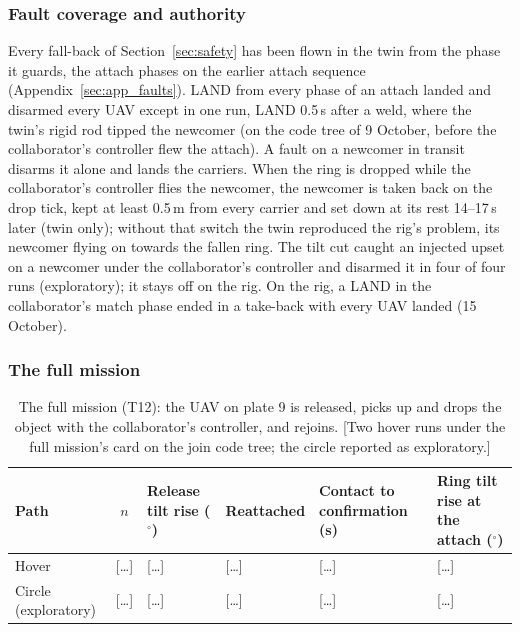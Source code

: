 
\subsubsection{Fault coverage and authority}
\label{sec:res_join_faults}

Every fall-back of Section~\ref{sec:safety} has been flown in the twin from the phase it guards, the attach
phases on the earlier attach sequence (Appendix~\ref{sec:app_faults}). LAND from every phase of an attach landed and
disarmed every UAV except in one run, LAND 0.5\,s after a weld, where the twin's rigid rod tipped the newcomer (on the code tree of 9 October, before the
collaborator's controller flew the attach). A fault on a newcomer in transit disarms it alone and lands the carriers.
When the ring is dropped while the collaborator's controller flies the newcomer, the newcomer is taken back on the
drop tick, kept at least 0.5\,m from every carrier and set down at its rest 14--17\,s later (twin only); without that
switch the twin reproduced the rig's problem, its newcomer flying on towards the fallen ring. The tilt cut caught an
injected upset on a newcomer under the collaborator's controller and disarmed it in four of four runs (exploratory);
it stays off on the rig. On the rig, a LAND in the collaborator's match phase ended in a take-back with every UAV
landed (15 October).

\subsubsection{The full mission}

\begin{table}[htbp]
  \centering
  \footnotesize
  \caption[The full mission]{The full mission (T12): the UAV on plate 9 is released, picks up and drops the object
  with the collaborator's controller, and rejoins. [Two hover runs under the full mission's card on the join code
  tree; the circle reported as exploratory.]}
  \label{tab:T12}
  \begin{tabularx}{\textwidth}{lcYYYY}
    \toprule
    Path & $n$ & Release tilt rise ($^\circ$) & Reattached & Contact to confirmation (s) & Ring tilt rise at the attach ($^\circ$) \\
    \midrule
    Hover & [\dots] & [\dots] & [\dots] & [\dots] & [\dots] \\
    Circle (exploratory) & [\dots] & [\dots] & [\dots] & [\dots] & [\dots] \\
    \bottomrule
  \end{tabularx}
\end{table}

